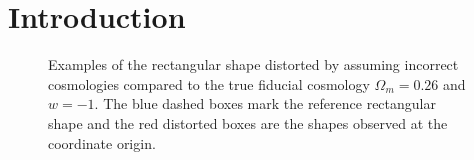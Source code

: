 \documentclass[iop]{emulateapj}
\begin{document}



\section{Introduction}

\begin{figure}
   \caption{\label{fig_xy}
   Examples of the rectangular shape distorted by assuming incorrect 
   cosmologies compared to the true fiducial cosmology $\Omega_m=0.26$ and $w=-1$.
   The blue dashed boxes mark the reference rectangular shape
   and the red distorted boxes are the shapes observed at the coordinate origin.
   }
\end{figure}
\end{document}
